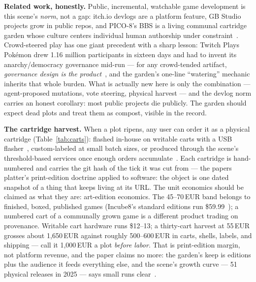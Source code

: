 \documentclass[10pt,letterpaper,twocolumn]{article}
\begin{document}
\textbf{Related work, honestly.} Public, incremental, watchable game development is this scene's \emph{norm}, not a gap: itch.io devlogs are a platform feature, GB Studio projects grow in public repos, and PICO-8's BBS is a living communal cartridge garden whose culture centers individual human authorship under constraint~\citep{lexaloffle2026pico8}. Crowd-steered play has one giant precedent with a sharp lesson: Twitch Plays Pok\'emon drew 1.16 million participants in sixteen days and had to invent its anarchy/democracy governance mid-run --- for any crowd-tended artifact, \emph{governance design is the product}~\citep{engadget2014tpp}, and the garden's one-line ``watering'' mechanic inherits that whole burden. What is actually new here is only the combination --- agent-proposed mutations, vote steering, physical harvest --- and the devlog norm carries an honest corollary: most public projects die publicly. The garden should expect dead plots and treat them as compost, visible in the record.

\textbf{The cartridge harvest.} When a plot ripens, any user can order it as a physical cartridge (Table~\ref{tab:carts}): flashed in-house on writable carts with a USB flasher~\citep{insidegadgets2026shop,adafruit2026flashing}, custom-labeled at small batch sizes, or produced through the scene's threshold-based services once enough orders accumulate~\citep{nintendodiff2026gb,bbbbbr2026vendors}. Each cartridge is hand-numbered and carries the git hash of the tick it was cut from --- the papers platter's print-edition doctrine applied to software: the object is one dated snapshot of a thing that keeps living at its URL. The unit economics should be claimed as what they are: art-edition economics. The 45--70\,EUR band belongs to finished, boxed, published games (Incube8's standard editions run \$59.99~\citep{rpgfan2025incube8}); a numbered cart of a communally grown game is a different product trading on provenance. Writable cart hardware runs \$12--13; a thirty-cart harvest at 55\,EUR grosses about 1{,}650\,EUR against roughly 500--600\,EUR in carts, shells, labels, and shipping --- call it 1{,}000\,EUR a plot \emph{before labor}. That is print-edition margin, not platform revenue, and the paper claims no more: the garden's keep is editions plus the audience it feeds everything else, and the scene's growth curve --- 51 physical releases in 2025 --- says small runs clear~\citep{nintendodiff2026gb}.
\end{document}
